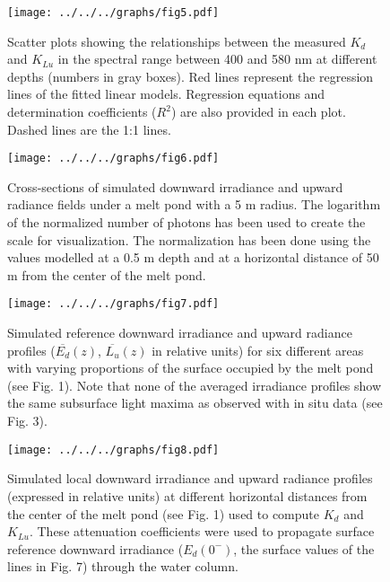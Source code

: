 \documentclass[12pt,a4paper]{scrartcl}
\newcommand{\ked}{\ensuremath{K_{d}}}
\newcommand{\klu}{\ensuremath{K_{Lu}}}
\newcommand{\edzero}{\ensuremath{{E_d(0^-)}}}
\newcommand{\meanedz}{\ensuremath{{\overline{E_d}(z)}}}
\newcommand{\meanluz}{\ensuremath{{\overline{L_u}(z)}}}
\begin{document}
\clearpage
\newpage

\begin{figure}[ht]
	\centering
	\texttt{[image: ../../../graphs/fig5.pdf]}
	\caption{Scatter plots showing the relationships between the measured \ked{} and \klu{} in the spectral range between 400 and 580 nm at different depths (numbers in gray boxes). Red lines represent the regression lines of the fitted linear models. Regression equations and determination coefficients ($R^2$) are also provided in each plot. Dashed lines are the 1:1 lines.}
\end{figure}

\clearpage
\newpage

\begin{figure}[ht]
	\centering
	\texttt{[image: ../../../graphs/fig6.pdf]}
	\caption{Cross-sections of simulated downward irradiance and upward radiance fields under a melt pond with a 5 m radius. The logarithm of the normalized number of photons has been used to create the scale for visualization. The normalization has been done using the values modelled at a 0.5 m depth and at a horizontal distance of 50 m from the center of the melt pond.}
\end{figure}

\clearpage
\newpage

\begin{figure}[h]
	\centering
	\texttt{[image: ../../../graphs/fig7.pdf]}
	\caption{Simulated reference downward irradiance and upward radiance profiles (\meanedz{}, \meanluz{} in relative units) for six different areas with varying proportions of the surface occupied by the melt pond (see Fig. 1). Note that none of the averaged irradiance profiles show the same subsurface light maxima as observed with in situ data (see Fig. 3).}
\end{figure}

\clearpage
\newpage

\begin{figure}[ht]
	\centering
	\texttt{[image: ../../../graphs/fig8.pdf]}
	\caption{Simulated local downward irradiance and upward radiance profiles (expressed in relative units) at different horizontal distances from the center of the melt pond (see Fig. 1) used to compute \ked{} and \klu{}. These attenuation coefficients were used to propagate surface reference downward irradiance (\edzero{}, the surface values of the lines in Fig. 7) through the water column.}
\end{figure}
\end{document}
